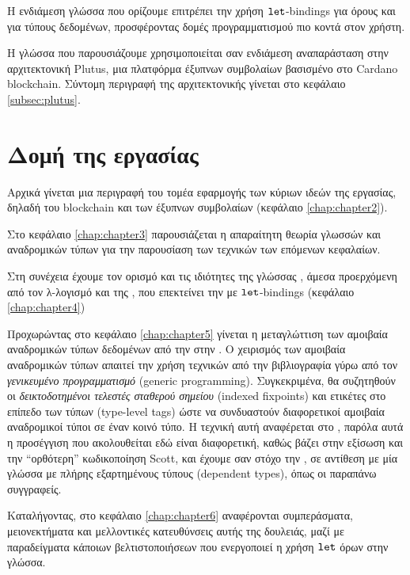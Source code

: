 Η ενδιάμεση γλώσσα που ορίζουμε επιτρέπει την χρήση $\operatorname{\texttt{let}}$-bindings για
όρους και για τύπους δεδομένων, προσφέροντας δομές προγραμματισμού πιο κοντά
στον χρήστη.

Η γλώσσα που παρουσιάζουμε χρησιμοποιείται σαν ενδιάμεση αναπαράσταση στην
αρχιτεκτονική Plutus, μια πλατφόρμα έξυπνων συμβολαίων βασισμένο στο Cardano
blockchain. Σύντομη περιγραφή της αρχιτεκτονικής γίνεται στο κεφάλαιο
\ref{subsec:plutus}.

\section{Δομή της εργασίας}

Αρχικά γίνεται μια περιγραφή του τομέα εφαρμογής των κύριων ιδεών της
εργασίας, δηλαδή του blockchain και των έξυπνων συμβολαίων (κεφάλαιο
\ref{chap:chapter2}).

Στο κεφάλαιο \ref{chap:chapter3}  παρουσιάζεται η απαραίτητη θεωρία
γλωσσών και αναδρομικών τύπων για την παρουσίαση των τεχνικών των επόμενων
κεφαλαίων.

Στη συνέχεια έχουμε τον ορισμό και τις ιδιότητες της γλώσσας \FOMF{},
άμεσα προερχόμενη από τον λ-λογισμό και της \FIR{}, που επεκτείνει την
\FOMF{} με $\operatorname{\texttt{let}}$-bindings (κεφάλαιο \ref{chap:chapter4})

Προχωρώντας στο κεφάλαιο \ref{chap:chapter5} γίνεται η μεταγλώττιση των
αμοιβαία αναδρομικών τύπων δεδομένων από την \FIR{} στην \FOMF{}. Ο
χειρισμός των αμοιβαία αναδρομικών τύπων απαιτεί την χρήση τεχνικών από
την βιβλιογραφία γύρω από τον \emph{γενικευμένο προγραμματισμό}
(generic programming). Συγκεκριμένα, θα  συζητηθούν οι
\emph{δεικτοδοτημένοι τελεστές σταθερού σημείου} (indexed fixpoints)
και ετικέτες στο επίπεδο των τύπων (type-level tags) ώστε να
συνδυαστούν διαφορετικοί αμοιβαία αναδρομικοί τύποι σε έναν κοινό τύπο.
Η τεχνική αυτή αναφέρεται στο \cite{fixmutualgeneric}, παρόλα αυτά η
προσέγγιση που ακολουθείται εδώ είναι διαφορετική, καθώς βάζει στην
εξίσωση και την ``ορθότερη'' κωδικοποίηση Scott, και έχουμε σαν στόχο
την \FOMF{}, σε αντίθεση με μία γλώσσα με πλήρης εξαρτημένους τύπους
(dependent types), όπως οι παραπάνω συγγραφείς.

Καταλήγοντας,  στο κεφάλαιο \ref{chap:chapter6} αναφέρονται
συμπεράσματα, μειονεκτήματα και μελλοντικές κατευθύνσεις αυτής της
δουλειάς, μαζί με παραδείγματα κάποιων βελτιστοποιήσεων που ενεργοποιεί
η χρήση $\operatorname{\texttt{let}}$ όρων στην γλώσσα.
